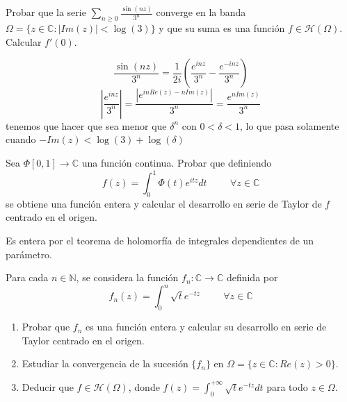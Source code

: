 \begin{ejer}
	Probar que la serie $\sum_{n\geq 0} \frac{\sin(nz)}{3^n}$ converge en la banda $\Omega = \{ z\in\mathbb{C} : |Im(z)|<\log(3) \}$ y que su suma es una función $f\in\mathcal{H}(\Omega)$. Calcular $f'(0)$.
\end{ejer}
\begin{sol}

$$\frac{\sin(nz)}{3^n} = \frac{1}{2i} \left( \frac{e^{inz}}{3^n} - \frac{e^{-inz}}{3^n} \right)$$
$$\left| \frac{e^{inz}}{3^n} \right| = \frac{|e^{inRe(z)-nIm(z)}|}{3^n} = \frac{e^{nIm(z)}}{3^n}$$
tenemos que hacer que sea menor que $\delta^n$ con $0<\delta<1$, lo que pasa solamente cuando $-Im(z) < \log(3)+\log(\delta)$
\end{sol}

\begin{ejer}
	Sea $\Phi [0,1]\rightarrow\mathbb{C}$ una función continua. Probar que definiendo
	$$ f(z) = \int_{0}^{1} \Phi(t)e^{itz}dt \hspace{1cm} \forall z\in\mathbb{C} $$
	se obtiene una función entera y calcular el desarrollo en serie de Taylor de $f$ centrado en el origen.
\end{ejer}
\begin{sol}
Es entera por el teorema de holomorfía de integrales dependientes de un parámetro.
\end{sol}



\begin{ejer}
	Para cada $n\in\mathbb{N}$, se considera la función $f_n:\mathbb{C}\rightarrow\mathbb{C}$ definida por
	$$ f_n(z) = \int_{0}^{n} \sqrt{t}e^{-tz} \hspace{1cm} \forall z\in\mathbb{C} $$
	\begin{enumerate}[label=\alph*)]
		\item Probar que $f_n$ es una función entera y calcular su desarrollo en serie de Taylor centrado en el origen.
		\item Estudiar la convergencia de la sucesión $\{f_n\}$ en $\Omega = \{ z\in\mathbb{C} : Re(z)>0 \}$.
		\item Deducir que $f\in\mathcal{H}(\Omega)$, donde $f(z) = \int_{0}^{+\infty} \sqrt{t}e^{-tz}dt$ para todo $z\in\Omega$.
	\end{enumerate}
\end{ejer}

